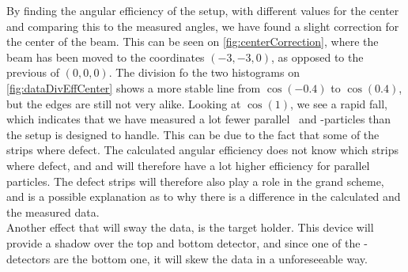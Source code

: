 By finding the angular efficiency of the setup, with different values for the center and comparing this to the measured angles, we have found a slight correction for the center of the beam. This can be seen on \cref{fig:centerCorrection}, where the beam has been moved to the coordinates $(-3, -3, 0)$, as opposed to the previous of $(0, 0, 0)$. The division fo the two histograms on \cref{fig:dataDivEffCenter} shows a more stable line from $\cos(-0.4)$ to $\cos(0.4)$, but the edges are still not very alike. Looking at $\cos(1)$, we see a rapid fall, which indicates that we have measured a lot fewer parallel \be\ and \al-particles than the setup is designed to handle. 
This can be due to the fact that some of the strips where defect. The calculated angular efficiency does not know which strips where defect, and and will therefore have a lot higher efficiency for parallel particles. The defect strips will therefore also play a role in the grand scheme, and is a possible explanation as to why there is a difference in the calculated and the measured data. \\
Another effect that will sway the data, is the target holder. This device will provide a shadow over the top and bottom detector, and since one of the \be-detectors are the bottom one, it will skew the data in a unforeseeable way. 
